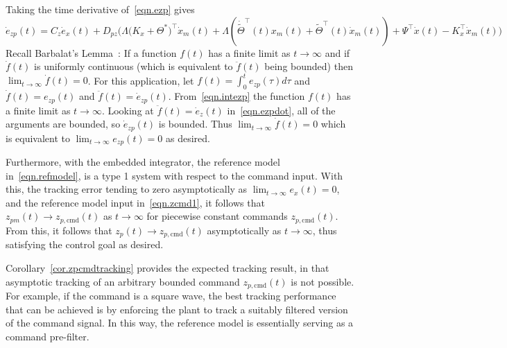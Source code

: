 \begin{proof-dan}
\begin{equation}
  \end{equation}
  Taking the time derivative of\ \eqref{eqn.ezp} gives
  \begin{equation}
    \label{eqn.ezpdot}
    \dot{e}_{zp}(t)
    =
    C_{z}\dot{e}_{x}(t) + D_{pz}\bigr(\Lambda\bigr(K_{x}+\Theta^{*}\bigr)^{\top}\dot{x}_{m}(t) + \Lambda(\dot{\widetilde{\Theta}}^{\top}(t)x_{m}(t)+\widetilde{\Theta}^{\top}(t)\dot{x}_{m}(t))+\Psi^{\top}\dot{x}(t) - K_{x}^{\top}\dot{x}_{m}(t)\bigr)
  \end{equation}
  Recall Barbalat's Lemma\ \cite{slotine.appliednonlinear.1991}: If a function $f(t)$ has a finite limit as $t\rightarrow\infty$ and if $\dot{f}(t)$ is uniformly continuous (which is equivalent to $\ddot{f}(t)$ being bounded) then $\lim_{t\rightarrow\infty}\dot{f}(t)=0$.
  For this application, let $f(t)=\int_{0}^{t} e_{zp}(\tau) d\tau$ and $\dot{f}(t)=e_{zp}(t)$ and $\ddot{f}(t)=\dot{e}_{zp}(t)$.
  From\ \eqref{eqn.intezp} the function $f(t)$ has a finite limit as $t\rightarrow\infty$.
  Looking at $\ddot{f}(t)=\dot{e}_{z}(t)$ in\ \eqref{eqn.ezpdot}, all of the arguments are bounded, so $\dot{e}_{zp}(t)$ is bounded.
  Thus $\lim_{t\rightarrow\infty}\dot{f}(t)=0$ which is equivalent to $\lim_{t\rightarrow\infty}e_{zp}(t)=0$ as desired.

  Furthermore, with the embedded integrator, the reference model in\ \eqref{eqn.refmodel}, is a type 1 system with respect to the command input.
  With this, the tracking error tending to zero asymptotically as $\lim_{t\rightarrow\infty}e_{x}(t)=0$, and the reference model input in\ \eqref{eqn.zcmd1}, it follows that $z_{pm}(t)\rightarrow z_{p,\text{cmd}}(t)$ as $t\rightarrow\infty$ for piecewise constant commands $z_{p,\text{cmd}}(t)$.
  From this, it follows that $z_{p}(t)\rightarrow z_{p,\text{cmd}}(t)$ asymptotically as $t\rightarrow\infty$, thus satisfying the control goal as desired.
\end{proof-dan}

\begin{rem-dan}
  Corollary~\ref{cor.zpcmdtracking} provides the expected tracking result, in that asymptotic tracking of an arbitrary bounded command $z_{p,\text{cmd}}(t)$ is not possible.
  For example, if the command is a square wave, the best tracking performance that can be achieved is by enforcing the plant to track a suitably filtered version of the command signal.
  In this way, the reference model is essentially serving as a command pre-filter.
\end{rem-dan}

